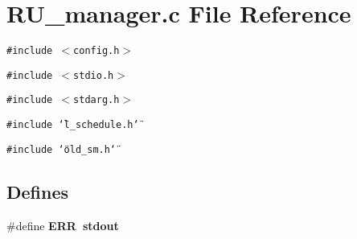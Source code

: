 \section{RU\_\-manager.c File Reference}
\label{RU__manager_8c}
{\tt \#include $<$config.h$>$}\par
{\tt \#include $<$stdio.h$>$}\par
{\tt \#include $<$stdarg.h$>$}\par
{\tt \#include \char`\"{}l\_\-schedule.h\char`\"{}}\par
{\tt \#include \char`\"{}old\_\-sm.h\char`\"{}}\par
\subsection*{Defines}
\begin{CompactItemize}
\item 
\#define \bf{ERR}~stdout
\end{CompactItemize}
